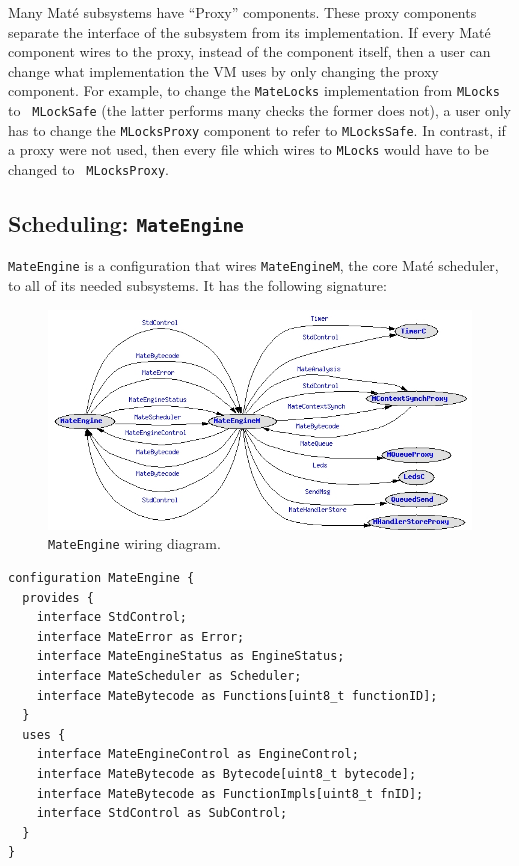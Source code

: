 \documentclass[12pt]{article}
\newcommand{\mate}{Mat\'{e}\xspace}
\begin{document}
Many \mate subsystems have ``Proxy'' components. These proxy
components separate the interface of the subsystem from its
implementation. If every \mate component wires to the proxy, instead
of the component itself, then a user can change what implementation
the VM uses by only changing the proxy component. For example, to
change the {\tt MateLocks} implementation from {\tt MLocks} to {\tt
MLockSafe} (the latter performs many checks the former does not), a
user only has to change the {\tt MLocksProxy} component to refer to
{\tt MLocksSafe}. In contrast, if a proxy were not used, then every
file which wires to {\tt MLocks} would have to be changed to {\tt
MLocksProxy}.

\subsection{Scheduling: {\tt MateEngine}}

{\tt MateEngine} is a configuration that wires {\tt MateEngineM}, the
core \mate scheduler, to all of its needed subsystems. It has the
following signature:

\newpage


\begin{figure}
\centering
\includegraphics[width=6in]{fig/MateEngine.jpg}
\caption{{\tt MateEngine} wiring diagram.}
\label{fig:mate-engine}
\end{figure}

{\scriptsize
\begin{verbatim}
configuration MateEngine {
  provides {
    interface StdControl;    
    interface MateError as Error;
    interface MateEngineStatus as EngineStatus;
    interface MateScheduler as Scheduler;
    interface MateBytecode as Functions[uint8_t functionID];
  }
  uses {
    interface MateEngineControl as EngineControl;
    interface MateBytecode as Bytecode[uint8_t bytecode];
    interface MateBytecode as FunctionImpls[uint8_t fnID];
    interface StdControl as SubControl;
  }
}
\end{verbatim}
}
\end{document}

